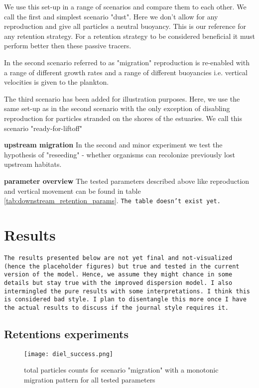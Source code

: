 \medskip

We use this set-up in a range of scenarios and compare them to each other.
We call the first and simplest scenario "dust". 
Here we don't allow for any reproduction and give all particles a neutral buoyancy.
This is our reference for any retention strategy. 
For a retention strategy to be considered beneficial it must perform better then these passive tracers.

In the second scenario referred to as "migration" reproduction is re-enabled with a range of different growth rates 
and a range of different buoyancies i.e. vertical velocities is given to the plankton.

The third scenario has been added for illustration purposes.
Here, we use the same set-up as in the second scenario with the only exception of disabling reproduction for particles stranded on the shores of the estuaries.
We call this scenario "ready-for-liftoff"
\label{txt:ready-for-liftoff}

\textbf{upstream migration}
In the second and minor experiment we test the hypothesis of "reseeding" - whether organisms can recolonize previously lost upstream habitats.


\textbf{parameter overview}
The tested parameters described above like reproduction and vertical movement can be found in table \ref{tab:downstream_retention_params}.
\smallskip
\texttt{The table doesn't exist yet.}
\smallskip


\section*{Results}

\texttt{The results presented below are not yet final and not-visualized (hence the placeholder figures)
        but true and tested in the current version of the model.
        Hence, we assume they might chance in some details but stay true with the improved dispersion model.
        \newline
        I also intermingled the pure results with some interpretations. I think this is considered bad style.
        I plan to disentangle this more once I have the actual results to discuss if the journal style requires it.}

\subsection*{Retentions experiments}

\begin{figure}
    \texttt{[image: diel\_success.png]}
    \caption[]{total particles counts for scenario "migration" with a monotonic migration pattern for all tested parameters}
    \label{fig:monotonic_particle_counts}
\end{figure}

